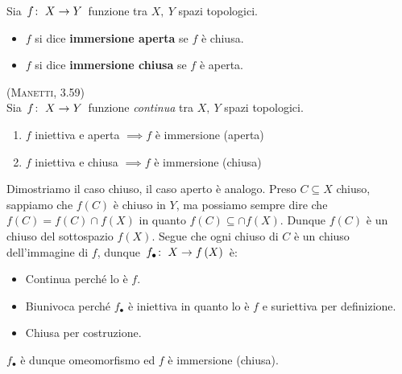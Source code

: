 \begin{define}
	Sia $\funz{f}{X}{Y}$ funzione tra $X,\ Y$ spazi topologici.
	\begin{itemize}
		\item $f$ si dice \textbf{immersione aperta} se $f$ è chiusa.
		\item $f$ si dice \textbf{immersione chiusa} se $f$ è aperta.
	\end{itemize}
\end{define}
\begin{lemming}\textsc{(Manetti, 3.59)}\\
	Sia $\funz{f}{X}{Y}$ funzione \textit{continua} tra $X,\ Y$ spazi topologici.
	\begin{enumerate}
		\item $f$ iniettiva e aperta $\implies f$ è immersione (aperta)
		\item $f$ iniettiva e chiusa $\implies f$ è immersione (chiusa)
	\end{enumerate}
\end{lemming}
\begin{demonstration}
	Dimostriamo il caso chiuso, il caso aperto è analogo.
	Preso $C\subseteq X$ chiuso, sappiamo che $f\left(C\right)$ è chiuso in $Y$, ma possiamo sempre dire che $f\left(C\right)=f\left(C\right)\cap f\left(X\right)$ in quanto $f\left(C\right)\subseteq \cap f\left(X\right)$. Dunque $f\left(C\right)$ è un chiuso del sottospazio $f\left(X\right)$. Segue che ogni chiuso di $C$ è un chiuso dell'immagine di $f$, dunque $\funz{f_{\bullet}}{X}{f\left(X\right)}$ è:
	\begin{itemize}
		\item Continua perché lo è $f$.
		\item Biunivoca perché $f_{\bullet}$ è iniettiva in quanto lo è $f$ e suriettiva per definizione.
		\item Chiusa per costruzione.
	\end{itemize}
	$f_{\bullet}$ è dunque omeomorfismo ed $f$ è immersione (chiusa).
\end{demonstration}
